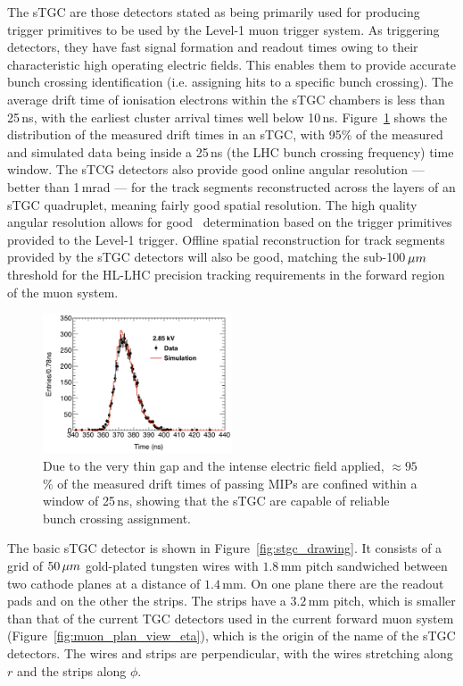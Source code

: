 The sTGC are those detectors stated as being primarily used for producing trigger primitives
to be used by the Level-1 muon trigger system.
As triggering detectors, they have fast signal formation and readout times owing to their characteristic high
operating electric fields.
This enables
them to provide accurate bunch crossing identification (i.e. assigning hits to a specific bunch crossing).
The average drift time of ionisation electrons within the sTGC chambers is less than 25\,ns,
with the earliest cluster arrival times well below 10\,ns.
Figure~\ref{fig:stgc_timing} shows the distribution of the measured drift times in an
sTGC, with 95\% of the measured and simulated data being inside a 25\,ns (the LHC bunch crossing
frequency) time window.
The sTCG detectors also provide good online angular resolution --- better than 1\,mrad --- for the track segments
reconstructed across the layers of an sTGC quadruplet, meaning fairly good spatial resolution.
The high quality angular resolution allows for good \pT~determination based on the trigger primitives
provided to the Level-1 trigger.
Offline spatial reconstruction for track segments provided by the sTGC detectors will also be good, matching
the sub-100$\,\mu m$ threshold for the HL-LHC precision tracking requirements in the forward region
of the muon system.

\begin{figure}[!htb]
    \begin{center}
        \includegraphics[width=0.5\textwidth]{figures/nsw/stgc_timing}
        \caption{
            Due to the very thin gap and the intense electric field applied,
            $\approx95$\,\% of the measured drift times of passing MIPs are
            confined within a window of 25\,ns, showing that the sTGC
            are capable of reliable bunch crossing assignment.
        }
        \label{fig:stgc_timing}
    \end{center}
\end{figure}

The basic sTGC detector is shown in Figure~\ref{fig:stgc_drawing}.
It consists of a grid of $50\,\mu m$ gold-plated tungsten wires with $1.8$\,mm pitch
sandwiched between two cathode planes at a distance of $1.4$\,mm.
On one plane there are the readout pads and on the other the strips.
The strips have a $3.2$\,mm pitch, which is smaller than that of the current TGC
detectors used in the current forward muon system (Figure~\ref{fig:muon_plan_view_eta}),
which is the origin of the name of the sTGC detectors.
The wires and strips are perpendicular, with the wires stretching along $r$ and the
strips along $\phi$.

